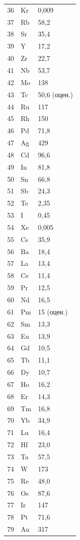 \documentclass[12pt,a4paper]{article}
\begin{document}
\begin{longtable}{p{0.6cm}p{1.2cm}p{1.5cm}}
		36 & Kr & 0,009 \\
		37 & Rb & 58,2 \\
		38 & Sr & 35,4 \\
		39 & Y  & 17,2 \\
		40 & Zr & 22,7 \\
		41 & Nb & 53,7 \\
		42 & Mo & 138 \\
		43 & Tc & 50,6 (оцен.) \\
		44 & Ru & 117 \\
		45 & Rh & 150 \\
		46 & Pd & 71,8 \\
		47 & Ag & 429 \\
		48 & Cd & 96,6 \\
		49 & In & 81,8 \\
		50 & Sn & 66,8 \\
		51 & Sb & 24,3 \\
		52 & Te & 2,35 \\
		53 & I  & 0,45 \\
		54 & Xe & 0,005 \\
		55 & Cs & 35,9 \\
		56 & Ba & 18,4 \\
		57 & La & 13,4 \\
		58 & Ce & 11,4 \\
		59 & Pr & 12,5 \\
		60 & Nd & 16,5 \\
		61 & Pm & 15 (оцен.) \\
		62 & Sm & 13,3 \\
		63 & Eu & 13,9 \\
		64 & Gd & 10,5 \\
		65 & Tb & 11,1 \\
		66 & Dy & 10,7 \\
		67 & Ho & 16,2 \\
		68 & Er & 14,3 \\
		69 & Tm & 16,8 \\
		70 & Yb & 34,9 \\
		71 & Lu & 16,4 \\
		72 & Hf & 23,0 \\
		73 & Ta & 57,5 \\
		74 & W  & 173 \\
		75 & Re & 48,0 \\
		76 & Os & 87,6 \\
		77 & Ir & 147 \\
		78 & Pt & 71,6 \\
		79 & Au & 317 \\

\end{longtable}
\end{document}
